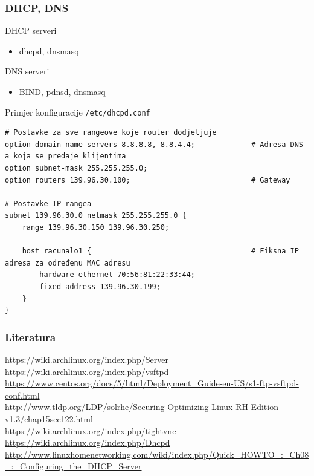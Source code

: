 \documentclass[t,table,usenames,dvipsnames]{beamer}
\begin{document}
\begin{frame}[fragile]

\frametitle{DHCP, DNS}

DHCP serveri
\begin{itemize}
	\item dhcpd, dnsmasq
\end{itemize}

DNS serveri
\begin{itemize}
	\item BIND, pdnsd, dnsmasq
\end{itemize}

\vfill

Primjer konfiguracije \texttt{/etc/dhcpd.conf}	
	\tiny
	\begin{verbatim}
# Postavke za sve rangeove koje router dodjeljuje
option domain-name-servers 8.8.8.8, 8.8.4.4;             # Adresa DNS-a koja se predaje klijentima
option subnet-mask 255.255.255.0;
option routers 139.96.30.100;                            # Gateway

# Postavke IP rangea
subnet 139.96.30.0 netmask 255.255.255.0 {
    range 139.96.30.150 139.96.30.250;
	
    host racunalo1 {                                     # Fiksna IP adresa za određenu MAC adresu
        hardware ethernet 70:56:81:22:33:44;
        fixed-address 139.96.30.199;
    }
}
	\end{verbatim}

\end{frame}



\begin{frame}
	\frametitle{Literatura}
	\url{https://wiki.archlinux.org/index.php/Server}
	\vfill
	\url{https://wiki.archlinux.org/index.php/vsftpd}\\
	\url{https://www.centos.org/docs/5/html/Deployment_Guide-en-US/s1-ftp-vsftpd-conf.html}\\
	\vfill
	\url{http://www.tldp.org/LDP/solrhe/Securing-Optimizing-Linux-RH-Edition-v1.3/chap15sec122.html}\\
	\vfill
	\url{https://wiki.archlinux.org/index.php/tightvnc}\\
	\vfill
	\url{https://wiki.archlinux.org/index.php/Dhcpd}\\
	\url{http://www.linuxhomenetworking.com/wiki/index.php/Quick_HOWTO_:_Ch08_:_Configuring_the_DHCP_Server}
\end{frame}
\end{document}
